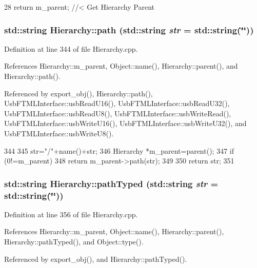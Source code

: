 \begin{DoxyCode}
28 { return m_parent; }  //< Get Hierarchy Parent
\end{DoxyCode}
\hypertarget{classHierarchy_aa7990fa7caf132d83e361ce033c6c65a}{
\subsubsection[{path}]{\setlength{\rightskip}{0pt plus 5cm}std::string Hierarchy::path (std::string {\em str} = {\ttfamily std::string(\char`\"{}\char`\"{})})}}
\label{classHierarchy_aa7990fa7caf132d83e361ce033c6c65a}


Definition at line 344 of file Hierarchy.cpp.

References Hierarchy::m\_\-parent, Object::name(), Hierarchy::parent(), and Hierarchy::path().

Referenced by export\_\-obj(), Hierarchy::path(), UsbFTMLInterface::usbReadU16(), UsbFTMLInterface::usbReadU32(), UsbFTMLInterface::usbReadU8(), UsbFTMLInterface::usbWriteRead(), UsbFTMLInterface::usbWriteU16(), UsbFTMLInterface::usbWriteU32(), and UsbFTMLInterface::usbWriteU8().


\begin{DoxyCode}
344                                       {
345   str="/"+name()+str;
346   Hierarchy *m_parent=parent();
347   if (0!=m_parent){
348     return m_parent->path(str);
349   }
350   return str;
351 }
\end{DoxyCode}
\hypertarget{classHierarchy_a1efd56cd164d328d2002e53a10a19b8c}{
\subsubsection[{pathTyped}]{\setlength{\rightskip}{0pt plus 5cm}std::string Hierarchy::pathTyped (std::string {\em str} = {\ttfamily std::string(\char`\"{}\char`\"{})})}}
\label{classHierarchy_a1efd56cd164d328d2002e53a10a19b8c}


Definition at line 356 of file Hierarchy.cpp.

References Hierarchy::m\_\-parent, Object::name(), Hierarchy::parent(), Hierarchy::pathTyped(), and Object::type().

Referenced by export\_\-obj(), and Hierarchy::pathTyped().


